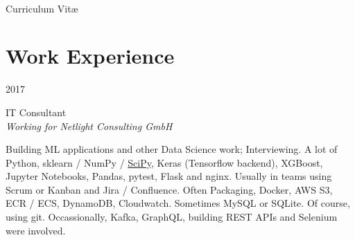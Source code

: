 \documentclass[a4paper,10pt]{article} %
\begin{document}
\color{text1} %


\par{\\ %
{\Huge \color{headings} Curriculum {Vit\ae}\\[15pt]\par}


\begin{minipage}[t]{0.5\textwidth}
\vspace{0pt} %


\section{Work Experience}


{\raggedleft\textsc{2017}\par}

{\raggedright\large IT Consultant\\
\textit{Working for Netlight Consulting GmbH}\\[5pt]}

\normalsize{Building ML applications and other Data Science work; Interviewing.
A lot of Python, sklearn / NumPy / \href{https://arxiv.org/pdf/1907.10121.pdf}{SciPy}, Keras (Tensorflow backend), XGBoost,
Jupyter Notebooks, Pandas, pytest, Flask and nginx. Usually in teams using
Scrum or Kanban and Jira / Confluence. Often Packaging, Docker, AWS S3, ECR /
ECS, DynamoDB, Cloudwatch. Sometimes MySQL or SQLite. Of course, using git.
Occassionally, Kafka, GraphQL, building REST APIs and Selenium were involved.}\\


\end{minipage}}
\end{document}
